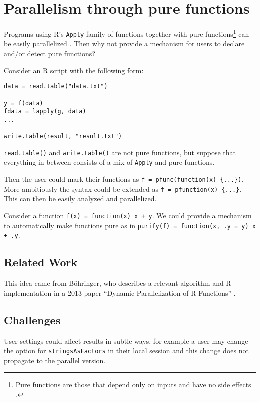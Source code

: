\documentclass[12pt]{article}
\begin{document}
\section{Parallelism through pure functions}

Programs using R's \texttt{Apply} family of functions together with pure
functions\footnote{Pure functions are those that depend only on inputs and
have no side effects \cite{wiki:purefunc}.} can be easily parallelized
\cite{bohringer2013dynamic}. Then why not provide a mechanism for users to
declare and/or detect pure functions?

Consider an R script with the following form:
\begin{verbatim}
data = read.table("data.txt")

y = f(data)
fdata = lapply(g, data)
...

write.table(result, "result.txt")
\end{verbatim}

\texttt{read.table()} and \texttt{write.table()} are not pure functions,
but suppose that everything in between consists of a mix of \texttt{Apply} and pure functions.

Then the user could mark their functions as \texttt{f = pfunc(function(x)
\{...\})}. More ambitiously the syntax could be extended as \texttt{f =
pfunction(x) \{...\}}. This can then be easily analyzed and parallelized.

Consider a function \texttt{f(x) = function(x) x + y}. We could provide a
mechanism to automatically
make functions pure as in \texttt{purify(f) = function(x, .y = y) x + .y}.

\subsection{Related Work}

This idea came from Böhringer, who describes a relevant algorithm and
R implementation in a 2013 paper ``Dynamic Parallelization of R Functions''
\cite{bohringer2013dynamic}.

\subsection{Challenges}

User settings could affect results in subtle ways, for example a user may
change the option for \texttt{stringsAsFactors} in their local session and
this change does not propagate to the parallel version.
\end{document}
